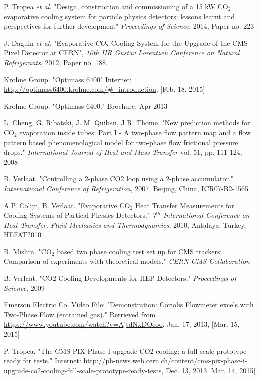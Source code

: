 \documentclass{report}
\begin{document}
\begin{thebibliography}{9}
P. Tropea \textit{et al.} "Design, construction and commissioning of a 15 kW CO$_2$ evaporative cooling system for particle physics detectors: lessons learnt and perspectives for further development" \textit{Proceedings of Science}, 2014, Paper no. 223

J. Daguin \textit{et al.} "Evaporative $CO_2$ Cooling System for the Upgrade of the CMS Pixel Detector at CERN", \textit{10th IIR Gustav Lorentzen Conference on Natural Refrigerants}, 2012, Paper no. 188.

Krohne Group. "Optimass 6400" Internet: \underline{http://optimass6400.krohne.com/\#\_introduction}, [Feb. 18, 2015]

Krohne Group. "Optimass 6400." Brochure. Apr 2013

L. Cheng, G. Ribatski, J. M. Quib$\acute{e}$n, J R. Thome. "New prediction methods for CO$_2$ evaporation inside tubes: Part I - A two-phase flow pattern map and a flow pattern based phenomenological model for two-phase flow frictional pressure drops." \textit{International Journal of Heat and Mass Transfer} vol. 51, pp. 111-124, 2008

B. Verlaat. "Controlling a 2-phase CO2 loop using a 2-phase accumulator." \textit{International Conference of Refrigeration}, 2007, Beijing, China, ICR07-B2-1565 

A.P. Colijn, B. Verlaat. "Evaporative CO$_2$ Heat Transfer Measurements for Cooling Systems of Partical Physics Detectors." \textit{7$^{
th}$ International Conference on Heat Transfer, Fluid Mechanics and Thermodynamics}, 2010, Antalaya, Turkey, HEFAT2010 

B. Mishra. "CO$_2$ based two phase cooling test set up for CMS trackers: Comparison of experiments with theoretical models." \textit{CERN CMS Collaboration}

B. Verlaat. "CO2 Cooling Developments for HEP Detectors." \textit{Proceedings of Science}, 2009

Emerson Electric Co. Video File: "Demonstration: Coriolis Flowmeter excels with Two-Phase Flow (entrained gas)." Retrieved from \underline{https://www.youtube.com/watch?v=AjtdNxDOeoo}, Jan. 17, 2013, [Mar. 15, 2015]

P. Tropea. "The CMS PIX Phase I upgrade CO2 cooling: a full scale prototype ready for tests." Internet: \underline{http://ph-news.web.cern.ch/content/cms-pix-phase-i-upgrade-co2-cooling-full-scale-prototype-ready-tests}, Dec. 13, 2013 [Mar. 14, 2015] 


\end{thebibliography}
\end{document}
